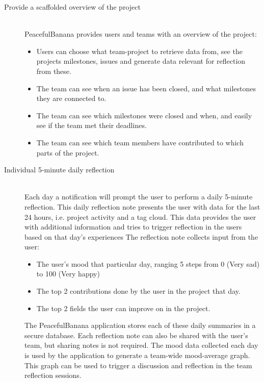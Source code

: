 \begin{description}
	\item[Provide a scaffolded overview of the project] \hfill \\
	PeacefulBanana provides users and teams with an overview of the project:
	\begin{itemize}
		\item Users can choose what team-project to retrieve data from, see the projects milestones, issues and generate data relevant for reflection from these.
		\item The team can see when an issue has been closed, and what milestones they are connected to.
		\item The team can see which milestones were closed and when, and easily see if the team met their deadlines. 
		\item The team can see which team members have contributed to which parts of the project.
	\end{itemize}

	\item[Individual 5-minute daily reflection] \hfill \\
	Each day a notification will prompt the user to perform a daily 5-minute reflection. This daily reflection note presents the user with data for the last 24 hours, i.e. project activity and a tag cloud. This data provides the user with additional information and tries to trigger reflection in the users based on that day's experiences The reflection note collects input from the user:
	\begin{itemize}
		\item The user's mood that particular day, ranging 5 steps from 0 (Very sad) to 100 (Very happy)
		\item The top 2 contributions done by the user in the project that day.
		\item The top 2 fields the user can improve on in the project.
	\end{itemize}
	The PeacefulBanana application stores each of these daily summaries in a secure database. Each reflection note can also be shared with the user's team, but sharing notes is not required. The mood data collected each day is used by the application to generate a team-wide mood-average graph. This graph can be used to trigger a discussion and reflection in the team reflection sessions. 


\end{description}
